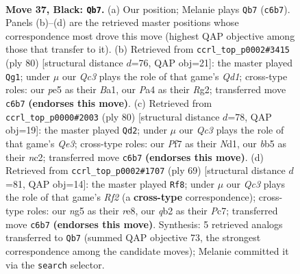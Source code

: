 \documentclass[11pt]{article}
\begin{document}
\clearpage

\begin{figure}[p]\centering
\begin{subfigure}{0.46\textwidth}\centering
\resizebox{\linewidth}{!}{%
\newchessgame
\chessboard[
  setfen={2b3k1/3nrp1p/2q3p1/1B2PpN1/p4P2/8/PQP2KPP/6R1 b - - 11 37},
  showmover=false,
  pgfstyle=straightmove, color=movearrow, markmove={c6-b7}
]}
\caption{}
\end{subfigure}\hfill
\begin{subfigure}{0.46\textwidth}\centering
\resizebox{\linewidth}{!}{%
\newchessgame
\chessboard[
  setfen={4r2k/6pn/2qp1p2/1p4P1/p2NP3/P3nP2/6R1/B2Q3K w - - 0 41},
  showmover=false,
  pgfstyle=straightmove, color=movearrow, markmove={d1-g1}
]}
\caption{}
\end{subfigure}
\\[4pt]
\begin{subfigure}{0.46\textwidth}\centering
\resizebox{\linewidth}{!}{%
\newchessgame
\chessboard[
  setfen={3r4/2q3pk/p6p/1p2pp2/1P6/P2RQPP1/2n1P2P/3N1K2 w - - 11 41},
  showmover=false,
  pgfstyle=straightmove, color=movearrow, markmove={e3-d2}
]}
\caption{}
\end{subfigure}\hfill
\begin{subfigure}{0.46\textwidth}\centering
\resizebox{\linewidth}{!}{%
\newchessgame
\chessboard[
  setfen={4R2k/2p2rp1/2nb3p/1p1q4/1P1N2P1/2Pp3P/5P2/2BQ2K1 b - - 13 35},
  showmover=false,
  pgfstyle=straightmove, color=movearrow, markmove={f7-f8}
]}
\caption{}
\end{subfigure}
\caption{\textbf{Move 37, Black: \texttt{Qb7}.} (a) Our position; Melanie plays \texttt{Qb7} (\texttt{c6b7}). Panels (b)--(d) are the retrieved master positions whose correspondence most drove this move (highest QAP objective among those that transfer to it). (b) Retrieved from \texttt{ccrl\_top\_p0002\#3415} (ply 80) [structural distance $d$=76, QAP obj=21]: the master played \texttt{Qg1}; under $\mu$ our \emph{Qc3} plays the role of that game's \emph{Qd1}; cross-type roles: our \emph{p}e5 as their \emph{B}a1, our \emph{P}a4 as their \emph{R}g2; transferred move \texttt{c6b7} \textbf{(endorses this move)}. (c) Retrieved from \texttt{ccrl\_top\_p0000\#2003} (ply 80) [structural distance $d$=78, QAP obj=19]: the master played \texttt{Qd2}; under $\mu$ our \emph{Qc3} plays the role of that game's \emph{Qe3}; cross-type roles: our \emph{P}f7 as their \emph{N}d1, our \emph{b}b5 as their \emph{n}c2; transferred move \texttt{c6b7} \textbf{(endorses this move)}. (d) Retrieved from \texttt{ccrl\_top\_p0002\#1707} (ply 69) [structural distance $d$=81, QAP obj=14]: the master played \texttt{Rf8}; under $\mu$ our \emph{Qc3} plays the role of that game's \emph{Rf2} (a \textbf{cross-type} correspondence); cross-type roles: our \emph{n}g5 as their \emph{r}e8, our \emph{q}b2 as their \emph{P}c7; transferred move \texttt{c6b7} \textbf{(endorses this move)}. Synthesis: 5 retrieved analogs transferred to \texttt{Qb7} (summed QAP objective 73, the strongest correspondence among the candidate moves); Melanie committed it via the \texttt{search} selector.}
\label{fig:thought-m73}
\end{figure}
\end{document}
